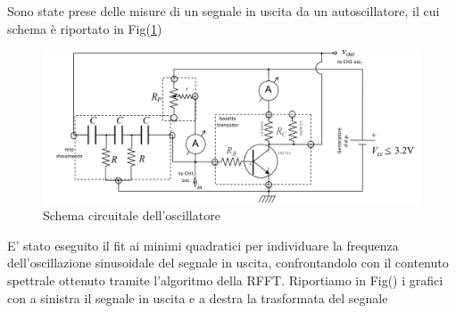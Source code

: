 \documentclass{article}
\begin{document}
Sono state prese delle misure di un segnale in uscita da un autoscillatore, il cui schema è riportato in Fig(\ref{fig:circuitino_oscillante})
\begin{figure}[H]
    \includegraphics[scale=0.50]{FFT11/schema_circuitino.png}
    \caption{Schema circuitale dell'oscillatore}
    \label{fig:circuitino_oscillante}
\end{figure}
E' stato eseguito il fit ai minimi quadratici per individuare la frequenza dell'oscillazione sinusoidale del segnale in uscita, confrontandolo con il contenuto spettrale ottenuto tramite l'algoritmo della RFFT.
Riportiamo in Fig() i grafici con a sinistra il segnale in uscita e a destra la trasformata del segnale
\end{document}
